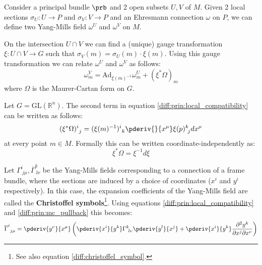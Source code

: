 	\begin{formula}
		Consider a principal bundle $\prb$ and 2 open subsets $U, V$ of $M$. Given 2 local sections $\sigma_U:U\rightarrow P$ and $\sigma_V:V\rightarrow P$ and an Ehresmann connection $\omega$ on $P$, we can define two Yang-Mills field $\omega^U$ and $\omega^V$ on $M$.
		
		On the intersection $U\cap V$ we can find a (unique) gauge transformation $\xi:U\cap V\rightarrow G$ such that $\sigma_V(m) = \sigma_U(m)\cdot\xi(m)$. Using this gauge transformation we can relate $\omega^U$ and $\omega^V$ as follows:
		\begin{equation}
			\label{diff:prin:local_compatibility}
			\omega^V_m = \text{Ad}_{\xi(m)^{-1}}\omega^U_m + (\xi^*\Omega)_m
		\end{equation}
		where $\Omega$ is the Maurer-Cartan form on $G$.
	\end{formula}
	
	\begin{example}
		Let $G=\text{GL}(\mathbb{R}^n)$. The second term in equation \ref{diff:prin:local_compatibility} can be written as follows:
		\begin{equation}
			(\xi^*\Omega)^i_{\ j} = (\xi(m)^{-1})^i_{\ k}\pderiv{}{x^\mu}\xi(p)^k_{\ j}dx^\mu
		\end{equation}
		at every point $m\in M$. Formally this can be written coordinate-independently as:
		\begin{equation}
			\label{diff:prin:mc_pullback}
			\xi^*\Omega = \xi^{-1}d\xi
		\end{equation}
	\end{example}
	
	\begin{example}
		Let $\Gamma^i_{\ j\mu}, \overline{\Gamma}^k_{\ l\nu}$ be the Yang-Mills fields corresponding to a connection of a frame bundle, where the sections are induced by a choice of coordinates ($x^i$ and $y^i$ respectively). In this case, the expansion coefficients of the Yang-Mills field are called the \textbf{Christoffel symbols}\footnote{See also equation \ref{diff:christoffel_symbol}.}. Using equations \ref{diff:prin:local_compatibility} and \ref{diff:prin:mc_pullback} this becomes:
		\begin{equation}
			\overline{\Gamma}^i_{\ j\mu} = \pderiv{y^\nu}{x^\mu}\left(\pderiv{x^i}{y^k}\Gamma^k_{\ l\nu}\pderiv{y^l}{x^j} + \pderiv{x^i}{y^k}\frac{\partial^2y^k}{\partial x^j\partial x^\nu}\right)
		\end{equation}
	\end{example}

